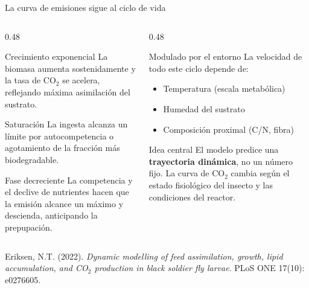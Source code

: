 \documentclass[aspectratio=169, 11pt]{beamer}
\begin{document}
\begin{frame}{La curva de emisiones sigue al ciclo de vida}
\begin{columns}[T]
\begin{column}{0.48\textwidth}
\begin{exampleblock}{Crecimiento exponencial}
La biomasa aumenta sostenidamente y la tasa de CO$_2$ se acelera, reflejando m\'{a}xima asimilaci\'{o}n del sustrato.
\end{exampleblock}
\vspace{0.2cm}
\begin{block}{Saturaci\'{o}n}
La ingesta alcanza un l\'{i}mite por autocompetencia o agotamiento de la fracci\'{o}n m\'{a}s biodegradable.
\end{block}
\vspace{0.2cm}
\begin{exampleblock}{Fase decreciente}
La competencia y el declive de nutrientes hacen que la emisi\'{o}n alcance un m\'{a}ximo y descienda, anticipando la prepupaci\'{o}n.
\end{exampleblock}
\end{column}
\begin{column}{0.48\textwidth}
\begin{block}{Modulado por el entorno}
La velocidad de todo este ciclo depende de:
\begin{itemize}
    \item Temperatura (escala metab\'{o}lica)
    \item Humedad del sustrato
    \item Composici\'{o}n proximal (C/N, fibra)
\end{itemize}
\end{block}
\vspace{0.2cm}
\begin{alertblock}{Idea central}
El modelo predice una \textbf{trayectoria din\'{a}mica}, no un n\'{u}mero fijo. La curva de CO$_2$ cambia seg\'{u}n el estado fisiol\'{o}gico del insecto y las condiciones del reactor.
\end{alertblock}
\end{column}
\end{columns}
\vfill
{\footnotesize Eriksen, N.T. (2022). \textit{Dynamic modelling of feed assimilation, growth, lipid accumulation, and CO$_2$ production in black soldier fly larvae}. PLoS ONE 17(10): e0276605.}
\end{frame}
\end{document}
